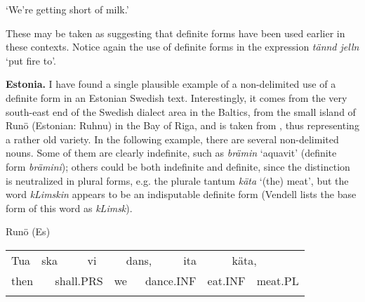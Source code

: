 \begin{styleTranslation}
‘We’re getting short of milk.’

\end{styleTranslation}

These may be taken as suggesting that definite forms have been used earlier in these contexts.  Notice again the use of definite forms in the expression \textit{tännd jelln} ‘put fire to’.

\begin{styleBodytextC}
\textbf{Estonia.} I have found a single plausible example of a non-delimited use of a definite form in an Estonian Swedish text. Interestingly, it comes from the very south-east end of the Swedish dialect area in the Baltics, from the small island of Runö (Estonian: Ruhnu) in the Bay of Riga, and is taken from \citet{Vendell1882}, thus representing a rather old variety. In the following example, there are several non-delimited nouns. Some of them are clearly indefinite, such as \textit{brämin} ‘aquavit’ (definite form \textit{brämini}); others could be both indefinite and definite, since the distinction is neutralized in plural forms, e.g. the plurale tantum \textit{käta} ‘(the) meat’, but the word \textit{kLimskin} appears to be an indisputable definite form (Vendell lists the base form of this word as \textit{kLimsk}).

\end{styleBodytextC}

\begin{listWWNumileveli}
\item 

\begin{styleExample}
\label{bkm:Ref136427219}Runö (Es)

\end{styleExample}

\end{listWWNumileveli}

\begin{styleBodyTextFirstIndentii}

\end{styleBodyTextFirstIndentii}

\begin{tabular}{llllllllllll}
\lsptoprule
Tua & \multicolumn{2}{l}{ska

} & \multicolumn{2}{l}{vi

} & \multicolumn{2}{l}{dans,

} & \multicolumn{2}{l}{ita

} & \multicolumn{2}{l}{käta,

} & \\
\multicolumn{2}{l}{then 

} & \multicolumn{2}{l}{shall.PRS

} & \multicolumn{2}{l}{we

} & \multicolumn{2}{l}{dance.INF

} & \multicolumn{2}{l}{eat.INF

} & \multicolumn{2}{l}{meat.PL

}\\
\lspbottomrule
\end{tabular}

